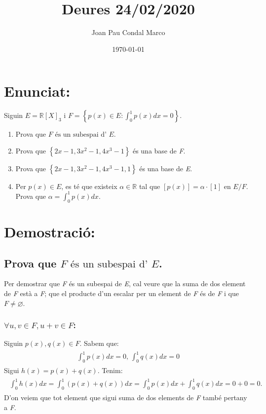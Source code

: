\documentclass[a4paper, 11pt]{article}
\title{Deures 24/02/2020}
\author{Joan Pau Condal Marco}
\date{\today}
\begin{document}
    \maketitle
    \justify
    \section{Enunciat:}
        Siguin ${E = \mathbb{R}[X]_{3} \text{ i } F = \left\{p(x) \in E: \int_0^1 p(x) dx = 0\right\}}$.
        \begin{enumerate}
            \item Prova que ${F \text{ \'es un subespai d' }E}$.
            \item Prova que ${\left\{2x-1, 3x^2-1, 4x^3-1\right\}}$ \'es una base de \emph{F}.
            \item Prova que ${\left\{2x-1, 3x^2-1, 4x^3-1, 1\right\}}$ \'es una base de \emph{E}.
            \item Per ${p(x) \in E}$, es t\'e que existeix ${\alpha \in \mathbb{R}}$ tal que ${\left[p(x)\right] = \alpha \cdot \left[1\right]}$ en ${E/F}$. Prova que ${\alpha = \int_0^1p(x)dx}$.
        \end{enumerate}

    \section{Demostraci\'o:}
        \subsection{Prova que ${F \text{ \'es un subespai d' }E}$.}
            Per demostrar que \emph{F} \'es un subespai de \emph{E}, cal veure que la suma de dos element de \emph{F} est\`a a \emph{F}; que el producte d'un escalar per un element de \emph{F} \'es de \emph{F} i que ${F \neq \varnothing}$.
            
            \subsubsection{${\forall u,v \in F, u + v\in F}$:}
            Siguin ${p(x),q(x)\in F}$. Sabem que:
            \begin{align*}
                \begin{aligned}
                    \int_0^1 p(x) dx = 0 \text{, }
                    \int_0^1 q(x) dx = 0
                \end{aligned}
            \end{align*}
            Sigui ${h(x) = p(x) + q(x)}$. Tenim:
            \begin{align*}
                \begin{aligned}
                    \int_0^1 h(x)dx = \int_0^1\left(p(x)+q(x)\right)dx = \int_0^1p(x)dx + \int_0^1q(x)dx = 0 + 0 = 0.
                \end{aligned}
            \end{align*}
            D'on veiem que tot element que sigui suma de dos elements de \emph{F} tamb\'e pertany a \emph{F}.
\end{document}
